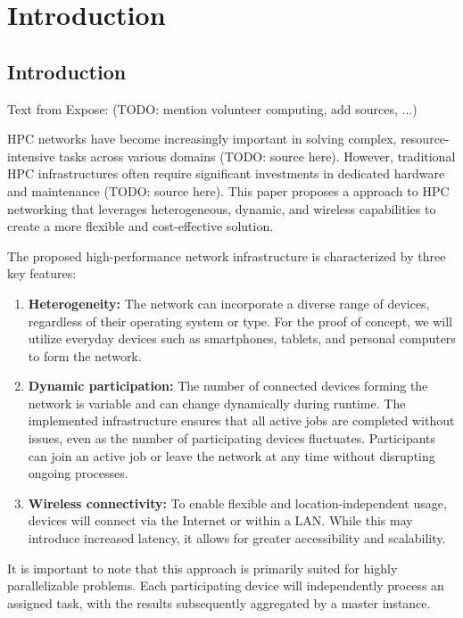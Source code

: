 \chapter{Introduction}
\label{ch:intro}
\section{Introduction}
Text from Expose: (TODO: mention volunteer computing, add sources, ...)

\ac{HPC} networks have become increasingly important in solving complex, resource-intensive tasks across various domains (TODO: source here). However, traditional \ac{HPC} infrastructures often require significant investments in dedicated hardware and maintenance (TODO: source here). This paper proposes a approach to \ac{HPC} networking that leverages heterogeneous, dynamic, and wireless capabilities to create a more flexible and cost-effective solution.

The proposed high-performance network infrastructure is characterized by three key features:

\begin{enumerate}
    \item \textbf{Heterogeneity:} The network can incorporate a diverse range of devices, regardless of their operating system or type. For the proof of concept, we will utilize everyday devices such as smartphones, tablets, and personal computers to form the network.
    
    \item \textbf{Dynamic participation:} The number of connected devices forming the network is variable and can change dynamically during runtime. The implemented infrastructure ensures that all active jobs are completed without issues, even as the number of participating devices fluctuates. Participants can join an active job or leave the network at any time without disrupting ongoing processes.
    
    \item \textbf{Wireless connectivity:} To enable flexible and location-independent usage, devices will connect via the Internet or within a \ac{LAN}. While this may introduce increased latency, it allows for greater accessibility and scalability.
\end{enumerate}

It is important to note that this approach is primarily suited for highly parallelizable problems. Each participating device will independently process an assigned task, with the results subsequently aggregated by a master instance.

